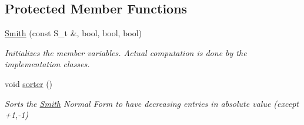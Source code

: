 \subsection*{Protected Member Functions}
\begin{DoxyCompactItemize}
\item 
\hyperlink{classMackey_1_1Smith_ab366b0cccb7fe065521142c442a0dcd3}{Smith} (const S\+\_\+t \&, bool, bool, bool)
\begin{DoxyCompactList}\small\item\em Initializes the member variables. Actual computation is done by the implementation classes. \end{DoxyCompactList}\item 
void \hyperlink{classMackey_1_1Smith_a30c76fbf9cb906c04908def480b0a321}{sorter} ()
\begin{DoxyCompactList}\small\item\em Sorts the \hyperlink{classMackey_1_1Smith}{Smith} Normal Form to have decreasing entries in absolute value (except +1,-\/1) \end{DoxyCompactList}\end{DoxyCompactItemize}
